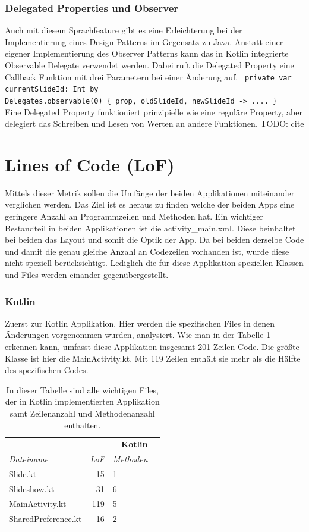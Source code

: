 \documentclass{sigchi-ext}
\begin{document}
\subsubsection{Delegated Properties und Observer}
Auch mit diesem Sprachfeature gibt es eine Erleichterung bei der Implementierung eines Design Patterns im Gegensatz zu Java. Anstatt einer eigener Implementierung des Observer Patterns kann das in Kotlin integrierte Observable Delegate verwendet werden. Dabei ruft die Delegated Property eine Callback Funktion mit drei Parametern bei einer Änderung auf. \ \texttt{private var currentSlideId: Int by \\Delegates.observable(0) \{ prop, oldSlideId, newSlideId -> .... \}} \\ Eine Delegated Property funktioniert prinzipielle wie eine reguläre Property, aber delegiert das Schreiben und Lesen von Werten an andere Funktionen. TODO: cite

\section{Lines of Code (LoF)}
Mittels dieser Metrik sollen die Umfänge der beiden Applikationen miteinander verglichen werden. Das Ziel ist es heraus zu finden welche der beiden Apps eine geringere Anzahl an Programmzeilen und Methoden hat. 
Ein wichtiger Bestandteil in beiden Applikationen ist die activity\_main.xml. Diese beinhaltet bei beiden das Layout und somit die Optik der App. Da bei beiden derselbe Code und damit die genau gleiche Anzahl an 
Codezeilen vorhanden ist, wurde diese nicht speziell berücksichtigt. Lediglich die für diese Applikation speziellen Klassen und Files werden einander gegenübergestellt.

\subsubsection{Kotlin}
Zuerst zur Kotlin Applikation. Hier werden die spezifischen Files in denen Änderungen vorgenommen wurden, analysiert. Wie man in der Tabelle 1 erkennen kann, umfasst diese Applikation insgesamt 201 Zeilen Code. Die größte Klasse ist hier die MainActivity.kt. Mit 119 Zeilen enthält sie mehr als die Hälfte des spezifischen Codes. 

\begin{table}
  \centering
  \begin{tabular}{l r l l}
    & & \multicolumn{2}{c}{\small{\textbf{Kotlin}}} \\
    \cmidrule(r){3-4}
    {\small\textit{Dateiname}}
    & {\small \textit{LoF}}
      & {\small \textit{Methoden}} \\
    \midrule
	Slide.kt & 15 & 1 \\
	Slideshow.kt & 31 & 6 \\
	MainActivity.kt & 119 & 5 \\
	SharedPreference.kt & 16 & 2\\
  \end{tabular}
  \caption{In dieser Tabelle sind alle wichtigen Files, der in Kotlin implementierten Applikation samt Zeilenanzahl und Methodenanzahl enthalten.}~\label{tab:table1}
\end{table}
\end{document}
